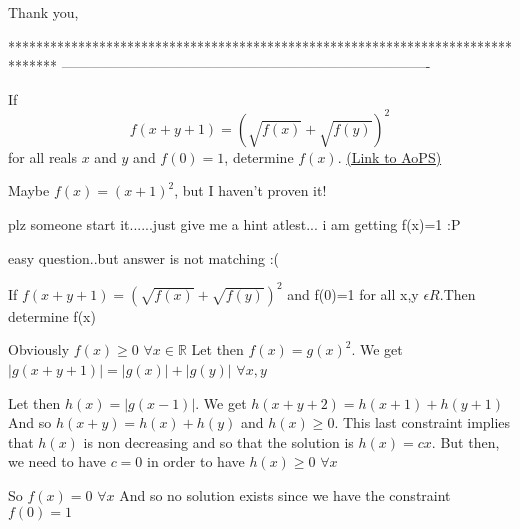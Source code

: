 \begin{solution}
	Thank you,
\end{solution}
*******************************************************************************
-------------------------------------------------------------------------------

\begin{problem}
	If  \[ f(x+y+1)=\left(\sqrt{f(x)}+\sqrt{f(y)}\right)^{2}\] for all reals $x$ and $y$ and $f(0)=1$, determine $f(x)$.
	\flushright \href{https://artofproblemsolving.com/community/c6h285629}{(Link to AoPS)}
\end{problem}



\begin{solution}
	Maybe $ f\left(x\right)=\left(x+1\right)^{2}$, but I haven't proven it!
\end{solution}



\begin{solution}
	plz someone start it......just give me a hint atlest...
i am getting f(x)=1   :P
\end{solution}



\begin{solution}
	\begin{tcolorbox}easy question..but answer is not matching :( 

If  $ f(x + y + 1) = (\sqrt {f(x)} + \sqrt {f(y)})^{2}$ and f(0)=1 for all x,y $ \epsilon R$.Then determine f(x)\end{tcolorbox}

Obviously $ f(x)\geq 0$ $ \forall x\in \mathbb R$
Let then $ f(x)=g(x)^2$. We get $ |g(x+y+1)|=|g(x)|+|g(y)|$ $ \forall x,y$

Let then $ h(x)=|g(x-1)|$. We get $ h(x+y+2)=h(x+1)+h(y+1)$ And so $ h(x+y)=h(x)+h(y)$ and $ h(x)\geq 0$. This last constraint implies that $ h(x)$ is non decreasing and so that the solution is $ h(x)=cx$. But then, we need to have $ c=0$ in order to have $ h(x)\geq 0$ $ \forall x$

So $ f(x)=0$ $ \forall x$
And so no solution exists since we have the constraint $ f(0)=1$
\end{solution}



